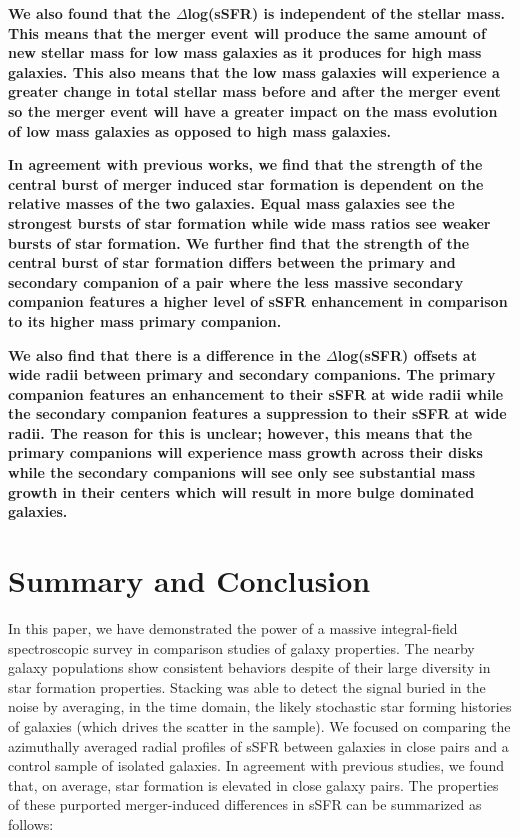 \documentclass[iop,revtex4,twocolumn,apj,numberedappendix,appendixfloats]{emulateapj}
\begin{document}
\textbf{
We also found that the $\Delta$log(sSFR) is independent of the stellar mass. This means that the merger event will produce the same amount of new stellar mass for low mass galaxies as it produces for high mass galaxies. This also means that the low mass galaxies will experience a greater change in total stellar mass before and after the merger event so the merger event will have a greater impact on the mass evolution of low mass galaxies as opposed to high mass galaxies.
}

\textbf{
In agreement with previous works, we find that the strength of the central burst of merger induced star formation is dependent on the relative masses of the two galaxies. Equal mass galaxies see the strongest bursts of star formation while wide mass ratios see weaker bursts of star formation. We further find that the strength of the central burst of star formation differs between the primary and secondary companion of a pair where the less massive secondary companion features a higher level of sSFR enhancement in comparison to its higher mass primary companion. 
}

\textbf{
We also find that there is a difference in the $\Delta$log(sSFR) offsets at wide radii between primary and secondary companions. The primary companion features an enhancement to their sSFR at wide radii while the secondary companion features a suppression to their sSFR at wide radii. The reason for this is unclear; however, this means that the primary companions will experience mass growth across their disks while the secondary companions will see only see substantial mass growth in their centers which will result in more bulge dominated galaxies.
}
\section{Summary and Conclusion}\label{sec:sum}

In this paper, we have demonstrated the power of a massive integral-field spectroscopic survey in comparison studies of galaxy properties. The nearby galaxy populations show consistent behaviors despite of their large diversity in star formation properties. Stacking was able to detect the signal buried in the noise by averaging, in the time domain, the likely stochastic star forming histories of galaxies (which drives the scatter in the sample). We focused on comparing the azimuthally averaged radial profiles of sSFR between galaxies in close pairs and a control sample of isolated galaxies. In agreement with previous studies, we found that, on average, star formation is elevated in close galaxy pairs. The properties of these purported merger-induced differences in sSFR can be summarized as follows:
\end{document}
